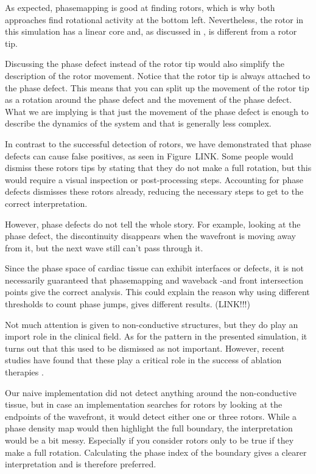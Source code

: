 \documentclass[twocolumn]{article}
\begin{document}
As expected, phasemapping is good at finding rotors, which is why both
approaches find rotational activity at the bottom left. Nevertheless,
the rotor in this simulation has a linear core and, as discussed in
\autocite{arno2021a, tomii2021spatial}, is different from a rotor tip.

Discussing the phase defect instead of the rotor tip would also simplify
the description of the rotor movement. Notice that the rotor tip is
always attached to the phase defect. This means that you can split up
the movement of the rotor tip as a rotation around the phase defect and
the movement of the phase defect. What we are implying is that just the
movement of the phase defect is enough to describe the dynamics of the
system and that is generally less complex.

In contrast to the successful detection of rotors, we have demonstrated
that phase defects can cause false positives, as seen in
Figure~LINK. Some people would dismiss these rotors tips
by stating that they do not make a full rotation, but this would require
a visual inspection or post-processing steps. Accounting for phase
defects dismisses these rotors already, reducing the necessary steps to
get to the correct interpretation.

However, phase defects do not tell the whole story. For example, looking
at the phase defect, the discontinuity disappears when the wavefront is
moving away from it, but the next wave still can't pass through it.

Since the phase space of cardiac tissue can exhibit interfaces or
defects, it is not necessarily guaranteed that phasemapping and waveback
-and front intersection points give the correct analysis. This could
explain the reason why using different thresholds to count phase jumps,
gives different results. (LINK!!!)

Not much attention is given to non-conductive structures, but they do
play an import role in the clinical field. As for the pattern in the
presented simulation, it turns out that this used to be dismissed as not
important. However, recent studies have found that these play a critical
role in the success of ablation therapies
\autocite{duytschaever2024atrial, santucci2024identification, takigawa2019a}.

Our naive implementation did not detect anything around the
non-conductive tissue, but in case an implementation searches for rotors
by looking at the endpoints of the wavefront, it would detect either one
or three rotors. While a phase density map would then highlight the full
boundary, the interpretation would be a bit messy. Especially if you
consider rotors only to be true if they make a full rotation.
Calculating the phase index of the boundary gives a clearer
interpretation and is therefore preferred.
\end{document}
